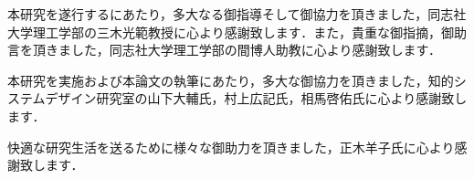 \documentclass[a4paper,11pt]{jreport}
\begin{document}
\thispagestyle{empty}
\begin{gratitude}
本研究を遂行するにあたり，多大なる御指導そして御協力を頂きました，同志社大学理工学部の三木光範教授に心より感謝致します．また，貴重な御指摘，御助言を頂きました，同志社大学理工学部の間博人助教に心より感謝致します．

本研究を実施および本論文の執筆にあたり，多大な御協力を頂きました，知的システムデザイン研究室の山下大輔氏，村上広記氏，相馬啓佑氏に心より感謝致します．

快適な研究生活を送るために様々な御助力を頂きました，正木羊子氏に心より感謝致します．

\end{gratitude}

\newpage
\thispagestyle{empty}



\thispagestyle{empty}



%
\end{document}
